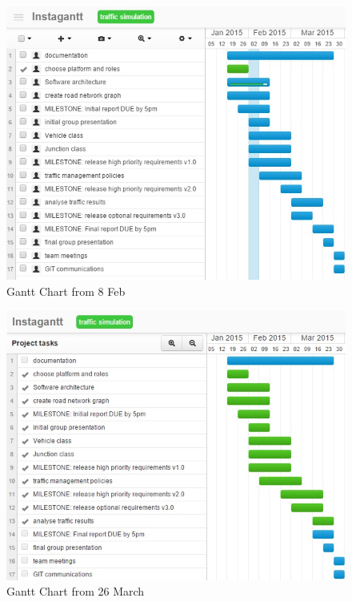 \documentclass[11pt]{article}
\begin{document}
\begin{enumerate}
\begin{figure}
\begin{center}
\includegraphics[scale=0.65]{gantt8Feb}
\caption{Gantt Chart from 8 Feb}
\end{center}
\end{figure}

\begin{figure}
\begin{center}
\includegraphics[scale=0.6]{gantt26Mar}
\caption{Gantt Chart from 26 March}
\end{center}
\end{figure}
\\



\end{enumerate}
\end{document}
